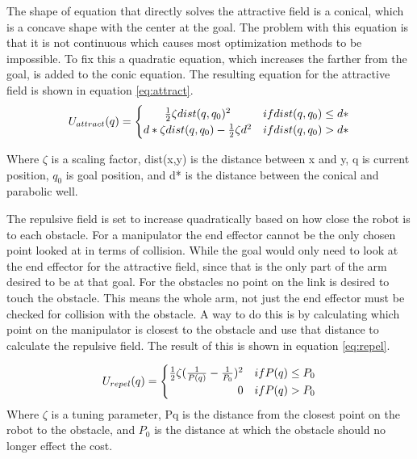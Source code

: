 The shape of equation that directly solves the attractive field is a conical, which is a concave shape with the center at the goal. The problem with this equation is that it is not continuous which causes most optimization methods to be impossible. To fix this a quadratic equation, which increases the farther from the goal, is added to the conic equation. The resulting equation for the attractive field is shown in equation \ref{eq:attract}.
\begin{equation}
\label{eq:attract}
 U_{attract}(q)  =
  \begin{cases} 
      \hfill \frac{1}{2}\zeta dist(q,q_0)^2    \hfill & if dist(q,q_0)\leq d* \\
      \hfill d*\zeta dist(q,q_0) -\frac{1}{2}\zeta d^2 \hfill &  if dist(q,q_0) > d* \\
  \end{cases}
\end{equation}

Where $\zeta$ is a scaling factor, dist(x,y) is the distance between x and y, q is current position, $q_0$ is goal position, and d* is the distance between the conical and parabolic well.

The repulsive field is set to increase quadratically based on how close the robot is to each obstacle. For a manipulator the end effector cannot be the only chosen point looked at in terms of collision. While the goal would only need to look at the end effector for the attractive field, since that is the only part of the arm desired to be at that goal. For the obstacles no point on the link is desired to touch the obstacle. This means the whole arm, not just the end effector must be checked for collision with the obstacle. A way to do this is by calculating which point on the manipulator is closest to the obstacle and use that distance to calculate the repulsive field. The result of this is shown in equation \ref{eq:repel}.

\begin{equation}
\label{eq:repel}
 U_{repel}(q)  =
  \begin{cases} 
      \hfill \frac{1}{2}\zeta (\frac{1}{P(q)} - \frac{1}{P_0})^2    \hfill & if P(q) \leq P_0 \\
      \hfill 0 &  if P(q) > P_0 \\
  \end{cases}
\end{equation}
Where $\zeta$ is a tuning parameter, P{q} is the distance from the closest point on the robot to the obstacle, and $P_0$ is the distance at which the obstacle should no longer effect the cost.

